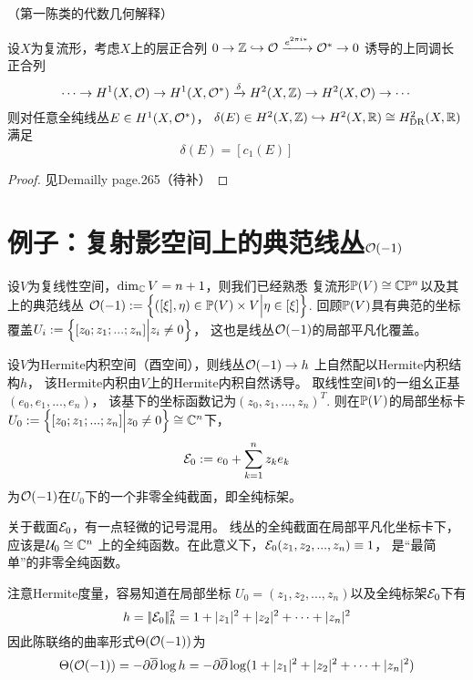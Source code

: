 \begin{thm}（第一陈类的代数几何解释）

设$X$为复流形，考虑$X$上的层正合列
$0\to\mathbb{Z}\hookrightarrow\mathcal{O}\xrightarrow{e^{2\pi i*}}\mathcal{O}^*\to 0$
诱导的上同调长正合列
$$
  \cdots\to
  H^1(X,\mathcal{O})\to H^1(X,\mathcal{O}^*)
  \xrightarrow{\delta}H^2(X,\mathbb{Z})\to H^2(X,\mathcal{O})\to\cdots
$$
则对任意全纯线丛$E\in H^1(X,\mathcal{O}^*)$，
$\delta(E)\in H^2(X,\mathbb{Z})\hookrightarrow H^2(X,\mathbb{R})\cong H^2_{\operatorname{DR}}(X,\mathbb{R})$满足
$$\delta(E)=[c_1(E)]$$
\end{thm}

\begin{proof}
{\color{red}见Demailly page.265（待补）}
\end{proof}


\section{例子：复射影空间上的典范线丛$\mathcal{O}(-1)$}

设$V$为复线性空间，$\dim_{\mathbb{C}}V=n+1$，则我们已经熟悉
复流形$\mathbb{P}(V)\cong\mathbb{C}\mathbb{P}^n$以及其上的典范线丛
$\mathcal{O}(-1):=\Big\{ ([\xi],\eta)\in\mathbb{P}(V)\times V \Big| \eta\in[\xi] \Big\}$.
回顾$\mathbb{P}(V)$具有典范的坐标覆盖$U_i:=\Big\{ [z_0;z_1;...;z_n] \Big| z_i\neq 0 \Big\}$，
这也是线丛$\mathcal{O}(-1)$的局部平凡化覆盖。

\begin{Example}
设$V$为Hermite内积空间（酉空间），则线丛$\mathcal{O}(-1)\to h$
上自然配以Hermite内积结构$h$，
该Hermite内积由$V$上的Hermite内积自然诱导。
取线性空间$V$的一组幺正基$(e_0,e_1,...,e_n)$，
该基下的坐标函数记为$(z_0,z_1,...,z_n)^T$.
则在$\mathbb{P}(V)$的局部坐标卡
$U_0:=\Big\{ [z_0;z_1;...;z_n] \Big| z_0\neq 0 \Big\}\cong\mathbb{C}^n$下，
$$\mathcal{E}_0:=e_0+\sum_{k=1}^{n}z_ke_k$$
为$\mathcal{O}(-1)$在$U_0$下的一个非零全纯截面，即全纯标架。
\end{Example}

关于截面$\mathcal{E}_0$，有一点轻微的记号混用。
线丛的全纯截面在局部平凡化坐标卡下，应该是$\mathcal{U}_0\cong\mathbb{C}^n$
上的全纯函数。在此意义下，$\mathcal{E}_0(z_1,z_2,...,z_n)\equiv 1$，
是“最简单”的非零全纯函数。

注意Hermite度量，容易知道在局部坐标
$U_0=(z_1,z_2,...,z_n)$以及全纯标架$\mathcal{E}_0$下有
$$
  h=|\!|\mathcal{E}_0|\!|^2_h=1+|z_1|^2+|z_2|^2+\cdots+|z_n|^2
$$
因此陈联络的曲率形式$\Theta(\mathcal{O}(-1))$为
$$
  \Theta(\mathcal{O}(-1))=-\partial\overline{\partial}\log h
=
  -\partial\overline{\partial}\log(1+|z_1|^2+|z_2|^2+\cdots+|z_n|^2)
$$

